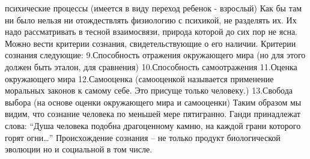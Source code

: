 \documentclass[12pt]{article}
\begin{document}
психические процессы (имеется в виду переход ребенок - взрослый)
Как бы там ни было нельзя ни отождествлять физиологию с психикой, не разделять их. Их надо рассматривать в
тесной взаимосвязи, природа которой до сих пор не ясна.
Можно вести критерии сознания, свидетельствующие о его наличии. Критерии сознания следующие:
9.Способность отражения окружающего мира (но для этого должен быть эталон, для сравнения)
10.Способность самоотражения
11.Оценка окружающего мира 
12.Самооценка (самооценкой называется применение моральных законов к самому себе. Это присуще только
человеку.)
13.Свобода выбора (на основе оценки окружающего мира и самооценки)
Таким образом мы видим, что сознание человека по меньшей мере пятигранно. Ганди принадлежат слова:
“Душа человека подобна драгоценному камню, на каждой грани которого горят огни…”
Происхождение сознания – не только продукт биологической эволюции но и социальной в том числе.


\newpage
\end{document}
